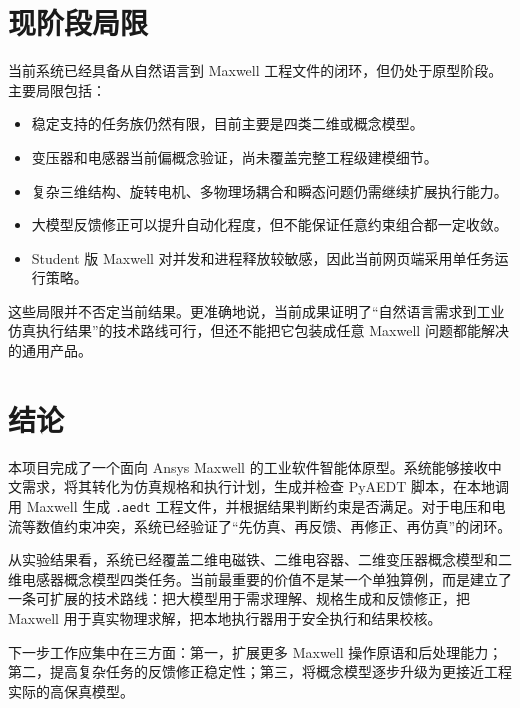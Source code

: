\documentclass[12pt,a4paper]{ctexart}
\begin{document}
\section{现阶段局限}

当前系统已经具备从自然语言到 Maxwell 工程文件的闭环，但仍处于原型阶段。主要局限包括：

\begin{itemize}
  \item 稳定支持的任务族仍然有限，目前主要是四类二维或概念模型。
  \item 变压器和电感器当前偏概念验证，尚未覆盖完整工程级建模细节。
  \item 复杂三维结构、旋转电机、多物理场耦合和瞬态问题仍需继续扩展执行能力。
  \item 大模型反馈修正可以提升自动化程度，但不能保证任意约束组合都一定收敛。
  \item Student 版 Maxwell 对并发和进程释放较敏感，因此当前网页端采用单任务运行策略。
\end{itemize}

这些局限并不否定当前结果。更准确地说，当前成果证明了“自然语言需求到工业仿真执行结果”的技术路线可行，但还不能把它包装成任意 Maxwell 问题都能解决的通用产品。

\section{结论}

本项目完成了一个面向 Ansys Maxwell 的工业软件智能体原型。系统能够接收中文需求，将其转化为仿真规格和执行计划，生成并检查 PyAEDT 脚本，在本地调用 Maxwell 生成 \texttt{.aedt} 工程文件，并根据结果判断约束是否满足。对于电压和电流等数值约束冲突，系统已经验证了“先仿真、再反馈、再修正、再仿真”的闭环。

从实验结果看，系统已经覆盖二维电磁铁、二维电容器、二维变压器概念模型和二维电感器概念模型四类任务。当前最重要的价值不是某一个单独算例，而是建立了一条可扩展的技术路线：把大模型用于需求理解、规格生成和反馈修正，把 Maxwell 用于真实物理求解，把本地执行器用于安全执行和结果校核。

下一步工作应集中在三方面：第一，扩展更多 Maxwell 操作原语和后处理能力；第二，提高复杂任务的反馈修正稳定性；第三，将概念模型逐步升级为更接近工程实际的高保真模型。
\end{document}
